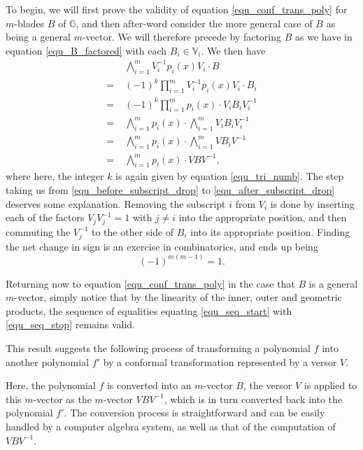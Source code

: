 \documentclass{ecgd-l}
\numberwithin{equation}{section}
\newcommand{\G}{\mathbb{G}}
\newcommand{\V}{\mathbb{V}}
\begin{document}
To begin, we will first prove the validity of equation \eqref{equ_conf_trans_poly} for $m$-blades $B$ of $\G$,
and then after-word consider the more general case of $B$ as being a general $m$-vector.
We will therefore precede by factoring $B$ as we have in equation \eqref{equ_B_factored}
with each $B_i\in\V_i$.  We then have
\begin{align}
 & \bigwedge_{i=1}^m V_i^{-1}p_i(x)V_i\cdot B\label{equ_seq_start} \\
=\;& (-1)^k\prod_{i=1}^m V_i^{-1}p_i(x)V_i\cdot B_i\nonumber \\
=\;& (-1)^k\prod_{i=1}^m p_i(x)\cdot V_iB_iV_i^{-1}\nonumber \\
=\;&\bigwedge_{i=1}^m p_i(x)\cdot\bigwedge_{i=1}^m V_iB_iV_i^{-1}\label{equ_before_subscript_drop} \\
=\;&\bigwedge_{i=1}^m p_i(x)\cdot\bigwedge_{i=1}^m VB_iV^{-1}\label{equ_after_subscript_drop} \\
=\;&\bigwedge_{i=1}^m p_i(x)\cdot VBV^{-1},\label{equ_seq_stop}
\end{align}
where here, the integer $k$ is again given by equation \eqref{equ_tri_numb}.  The step taking us from
\eqref{equ_before_subscript_drop} to \eqref{equ_after_subscript_drop} deserves some explanation.
Removing the subscript $i$ from $V_i$ is done by inserting each of the factors $V_jV_j^{-1}=1$ with $j\neq i$
into the appropriate position, and then
commuting the $V_j^{-1}$ to the other side of $B_i$ into its appropriate position.  Finding the net change in sign
is an exercise in combinatorics, and ends up being
\begin{equation*}
(-1)^{m(m-1)}=1.
\end{equation*}

Returning now to equation \eqref{equ_conf_trans_poly} in the case that $B$ is a general $m$-vector, simply notice
that by the linearity of the inner, outer and
geometric products, the sequence of equalities equating \eqref{equ_seq_start} with \eqref{equ_seq_stop} remains valid.

This result suggests the following process of transforming a polynomial $f$ into another polynomial $f'$ by a conformal
transformation represented by a versor $V$.
\begin{center}
\end{center}
Here, the polynomial $f$ is converted into an $m$-vector $B$, the versor $V$ is applied to this $m$-vector
as the $m$-vector $VBV^{-1}$, which is in turn converted back into the polynomial $f'$.  The conversion
process is straightforward and can be easily handled by a computer algebra system, as well as that
of the computation of $VBV^{-1}$.
\end{document}
